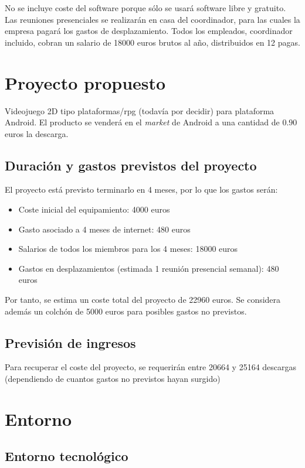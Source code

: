 No se incluye coste del software porque sólo se usará software libre y
gratuito. Las reuniones presenciales se realizarán en casa del coordinador,
para las cuales la empresa pagará los gastos de desplazamiento. Todos los
empleados, coordinador incluido, cobran un salario de 18000 euros brutos al
año, distribuidos en 12 pagas.

\section{Proyecto propuesto}

Videojuego 2D tipo plataformas/rpg (todavía por decidir) para plataforma
Android. El producto se venderá en el {\em market} de Android a una cantidad de
$0.90$ euros la descarga.

\subsection{Duración y gastos previstos del proyecto}

El proyecto está previsto terminarlo en 4 meses, por lo que los gastos serán:

\begin{itemize}
\item Coste inicial del equipamiento: 4000 euros
\item Gasto asociado a 4 meses de internet: 480 euros
\item Salarios de todos los miembros para los 4 meses: 18000 euros
\item Gastos en desplazamientos (estimada 1 reunión presencial semanal): 480 euros
\end{itemize}

Por tanto, se estima un coste total del proyecto de 22960 euros. Se considera
además un colchón de 5000 euros para posibles gastos no previstos.

\subsection{Previsión de ingresos}

Para recuperar el coste del proyecto, se requerirán entre 20664 y 25164
descargas (dependiendo de cuantos gastos no previstos hayan surgido)

\section{Entorno}

\subsection{Entorno tecnológico}

